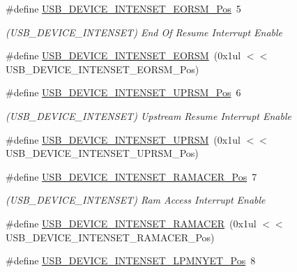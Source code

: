 \begin{DoxyCompactItemize}
\item 
\#define \mbox{\hyperlink{group___s_a_m_d21___u_s_b_ga2c2ddbbc80fa6e3c131d2d27d5bf4336}{U\+S\+B\+\_\+\+D\+E\+V\+I\+C\+E\+\_\+\+I\+N\+T\+E\+N\+S\+E\+T\+\_\+\+E\+O\+R\+S\+M\+\_\+\+Pos}}~5
\begin{DoxyCompactList}\small\item\em (U\+S\+B\+\_\+\+D\+E\+V\+I\+C\+E\+\_\+\+I\+N\+T\+E\+N\+S\+ET) End Of Resume Interrupt Enable \end{DoxyCompactList}\item 
\#define \mbox{\hyperlink{group___s_a_m_d21___u_s_b_gadb18f5d799e76facbbc77820a188096d}{U\+S\+B\+\_\+\+D\+E\+V\+I\+C\+E\+\_\+\+I\+N\+T\+E\+N\+S\+E\+T\+\_\+\+E\+O\+R\+SM}}~(0x1ul $<$$<$ U\+S\+B\+\_\+\+D\+E\+V\+I\+C\+E\+\_\+\+I\+N\+T\+E\+N\+S\+E\+T\+\_\+\+E\+O\+R\+S\+M\+\_\+\+Pos)
\item 
\#define \mbox{\hyperlink{group___s_a_m_d21___u_s_b_ga43e85c11c74ebc1690df9aa6585d9470}{U\+S\+B\+\_\+\+D\+E\+V\+I\+C\+E\+\_\+\+I\+N\+T\+E\+N\+S\+E\+T\+\_\+\+U\+P\+R\+S\+M\+\_\+\+Pos}}~6
\begin{DoxyCompactList}\small\item\em (U\+S\+B\+\_\+\+D\+E\+V\+I\+C\+E\+\_\+\+I\+N\+T\+E\+N\+S\+ET) Upstream Resume Interrupt Enable \end{DoxyCompactList}\item 
\#define \mbox{\hyperlink{group___s_a_m_d21___u_s_b_gaade16f0cfa2801f40b5c5f809e708993}{U\+S\+B\+\_\+\+D\+E\+V\+I\+C\+E\+\_\+\+I\+N\+T\+E\+N\+S\+E\+T\+\_\+\+U\+P\+R\+SM}}~(0x1ul $<$$<$ U\+S\+B\+\_\+\+D\+E\+V\+I\+C\+E\+\_\+\+I\+N\+T\+E\+N\+S\+E\+T\+\_\+\+U\+P\+R\+S\+M\+\_\+\+Pos)
\item 
\#define \mbox{\hyperlink{group___s_a_m_d21___u_s_b_ga9c8cf31bb8db13847199821463b87890}{U\+S\+B\+\_\+\+D\+E\+V\+I\+C\+E\+\_\+\+I\+N\+T\+E\+N\+S\+E\+T\+\_\+\+R\+A\+M\+A\+C\+E\+R\+\_\+\+Pos}}~7
\begin{DoxyCompactList}\small\item\em (U\+S\+B\+\_\+\+D\+E\+V\+I\+C\+E\+\_\+\+I\+N\+T\+E\+N\+S\+ET) Ram Access Interrupt Enable \end{DoxyCompactList}\item 
\#define \mbox{\hyperlink{group___s_a_m_d21___u_s_b_ga820b78747c2c8011dde08f2d6e63f30d}{U\+S\+B\+\_\+\+D\+E\+V\+I\+C\+E\+\_\+\+I\+N\+T\+E\+N\+S\+E\+T\+\_\+\+R\+A\+M\+A\+C\+ER}}~(0x1ul $<$$<$ U\+S\+B\+\_\+\+D\+E\+V\+I\+C\+E\+\_\+\+I\+N\+T\+E\+N\+S\+E\+T\+\_\+\+R\+A\+M\+A\+C\+E\+R\+\_\+\+Pos)
\item 
\#define \mbox{\hyperlink{group___s_a_m_d21___u_s_b_gac25ebe4d202de9447042d89bc2b09369}{U\+S\+B\+\_\+\+D\+E\+V\+I\+C\+E\+\_\+\+I\+N\+T\+E\+N\+S\+E\+T\+\_\+\+L\+P\+M\+N\+Y\+E\+T\+\_\+\+Pos}}~8
$$
\end{DoxyCompactItemize}
